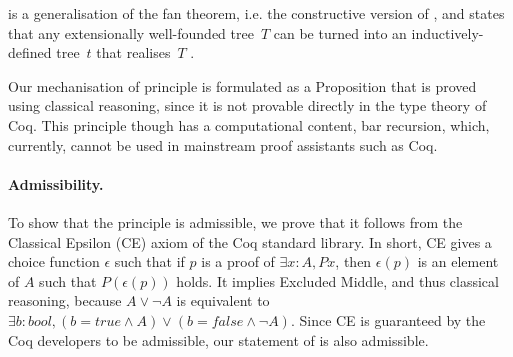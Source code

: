 \Barinduction is a generalisation of the fan theorem, i.e. the
constructive version
of \koenigslemma \cite[pag. 56]{dummett2000elements},
and states that any extensionally well-founded tree~$T$ can be turned into an
inductively-defined tree~$t$ that realises~$T$ \cite{DBLP:conf/lics/BredeH21,kleene1965foundations}.

Our mechanisation of \barinduction principle is formulated as a Proposition that
is proved using classical reasoning, since it is not provable directly in the
type theory of Coq.
%
This principle though has a computational content, bar recursion, which,
currently, cannot be used in mainstream proof assistants such as Coq.

\paragraph{Admissibility.}
To show that the principle is admissible, we prove that it follows
from the Classical Epsilon (CE) axiom of the Coq standard library.
In short, CE gives a choice function $\epsilon$ such that if $p$ is a proof of
$\exists x: A, P x$, then $\epsilon(p)$ is an element of $A$ such that $P
(\epsilon(p))$ holds. It implies Excluded Middle, and thus classical reasoning,
because $A \vee \neg A$ is equivalent to $\exists b: bool, (b=true \land A) \vee
(b=false \land \neg A)$.
Since CE is guaranteed by the Coq developers to be admissible, our statement of
\barinduction is also admissible.





